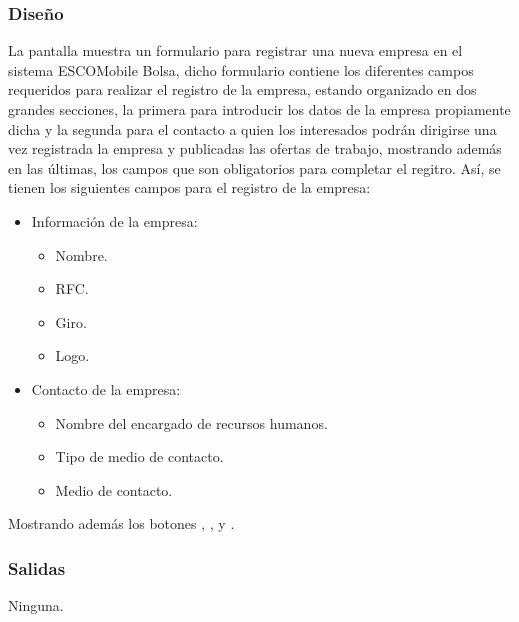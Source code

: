 \subsubsection{Diseño}
	\noindent
	La pantalla muestra un formulario para registrar una nueva empresa en el sistema ESCOMobile Bolsa, dicho formulario contiene los diferentes campos requeridos para realizar el registro de la empresa, estando organizado en dos grandes secciones, la primera para introducir los datos de la empresa propiamente dicha y la segunda para el contacto a quien los interesados podrán dirigirse una vez registrada la empresa y publicadas las ofertas de trabajo, mostrando además en las últimas, los campos que son obligatorios para completar el regitro. Así, se tienen los siguientes campos para el registro de la empresa:
	\begin{itemize}
		\item Información de la empresa:
		\begin{itemize}
			\item Nombre.
			\item RFC.
			\item Giro.
			\item Logo.
		\end{itemize}
		\item Contacto de la empresa:
		\begin{itemize}
			\item Nombre del encargado de recursos humanos.
			\item Tipo de medio de contacto. 
			\item Medio de contacto. 
		\end{itemize}
	\end{itemize}
	Mostrando además los botones , \IUbutton{+},  y .



\subsubsection{Salidas}
	\noindent
	Ninguna.


